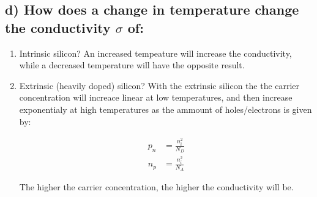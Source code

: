\subsection*{d) How does a change in temperature change the conductivity $\sigma$ of:}
\begin{enumerate}
    \item Intrinsic silicon?
    \subitem An increased tempeature will increase the conductivity, while a decreased temperature will have the opposite result.
    \item Extrinsic (heavily doped) silicon?
    \subitem  With the extrinsic silicon the the carrier concentration will increace linear at low temperatures, and then increase exponentialy at high temperatures as the ammount of holes/electrons is given by:
    
    \begin{align*}
        p_n&=\frac{n_i ^2}{N_D} \\
        n_p&=\frac{n_i ^2}{N_A}
    \end{align*}

    The higher the carrier concentration, the higher the conductivity will be.
\end{enumerate}



